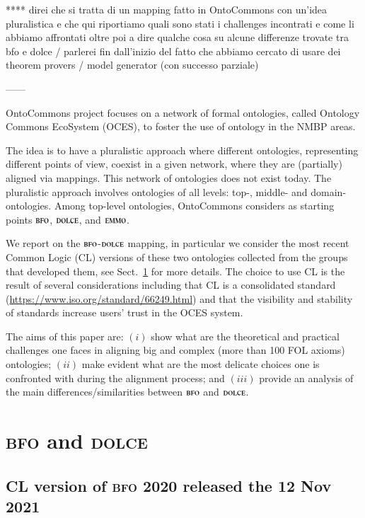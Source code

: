 \documentclass[ao]{iosart2x}
\newcommand{\dolce}{{\textsc{dolce}}}
\newcommand{\bfo}{{\textsc{bfo}}}
\newcommand{\emmo}{{\textsc{emmo}}}
\begin{document}
{\color{red} **** direi che si tratta di un mapping fatto in OntoCommons con un'idea pluralistica e che qui riportiamo quali sono stati i challenges incontrati e come li abbiamo affrontati oltre poi a dire qualche cosa su alcune differenze trovate tra bfo e dolce / parlerei fin dall'inizio del fatto che abbiamo cercato di usare dei theorem provers / model generator (con successo parziale)}

------

OntoCommons project focuses on a network of formal ontologies, called Ontology Commons EcoSystem (OCES), to foster the use of ontology in the NMBP areas. 

The idea is to have a pluralistic approach where different ontologies, representing different points of view, coexist in a given network, where they are (partially) aligned via mappings. This network of ontologies does not exist today. The pluralistic approach involves ontologies of all levels: top-, middle- and domain-ontologies. Among top-level ontologies, OntoCommons considers as starting points $\bfo$, $\dolce$, and $\emmo$.

We report on the $\bfo$-$\dolce$ mapping, in particular we consider the most recent Common Logic (CL) versions of these two ontologies collected from the groups that developed them, see Sect.~\ref{sect_bfo_and_dolce} for more details. The choice to use CL is the result of several considerations including that CL is a consolidated standard (\url{https://www.iso.org/standard/66249.html}) and that the visibility and stability of standards increase users' trust in the OCES system.

The aims of this paper are:  $(i)$ show what are the theoretical and practical challenges one faces in aligning big and complex (more than 100 FOL axioms) ontologies; $(ii)$ make evident what are the most delicate choices one is confronted with during the alignment process; and $(iii)$ provide an analysis of the main differences/similarities between $\bfo$ and $\dolce$.


\section{{\bfo} and {\dolce}}\label{sect_bfo_and_dolce}

\subsection{CL version of {\bfo} 2020 released the 12 Nov 2021}\label{sect_bfo}
\end{document}
